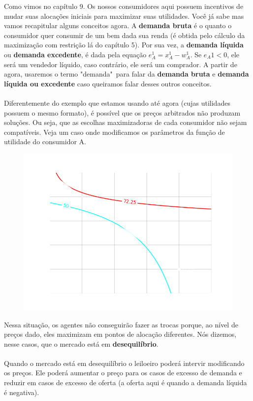 \documentclass[a4paper,11pt,oneside]{book}
\theoremstyle{definition}
\theoremstyle{break}
\begin{document}
Como vimos no capítulo 9. Os nossos consumidores aqui possuem incentivos de mudar suas alocações iniciais para maximizar suas utilidades. Você já sabe mas vamos recapitular alguns conceitos agora. A \textbf{demanda bruta} é o quanto o consumidor quer consumir de um bem dada sua renda (é obtida pelo cálculo da maximização com restrição lá do capítulo 5). Por sua vez, a \textbf{demanda líquida} ou \textbf{demanda excedente}, é dada pela equação $e_A^1 = x_A^1 - w_A^1$. Se $e_A1 < 0$, ele será um vendedor líquido, caso contrário, ele será um comprador. A partir de agora, usaremos o termo "demanda"\ para falar da \textbf{demanda bruta} e \textbf{demanda líquida ou excedente} caso queiramos falar desses outros conceitos.
\\
\\
Diferentemente do exemplo que estamos usando até agora (cujas utilidades possuem o mesmo formato), é possível que os preços arbitrados não produzam soluções. Ou seja, que as escolhas maximizadoras de cada consumidor não sejam compatíveis. Veja um caso onde modificamos os parâmetros da função de utilidade do consumidor A.

\begin{figure}[H]
\centering
\includegraphics[scale=0.6]{cap32_4-caixa_edgeworth_3.png}
\end{figure}


Nessa situação, os agentes não conseguirão fazer as trocas porque, ao nível de preços dado, eles maximizam em pontos de alocação diferentes. Nós dizemos, nesse casos, que o mercado está em \textbf{desequilíbrio}.
\\
\\
Quando o mercado está em desequilíbrio o leiloeiro poderá intervir modificando os preços. Ele poderá aumentar o preço para os casos de excesso de demanda e reduzir em casos de excesso de oferta (a oferta aqui é quando a demanda líquida é negativa). 
\end{document}
